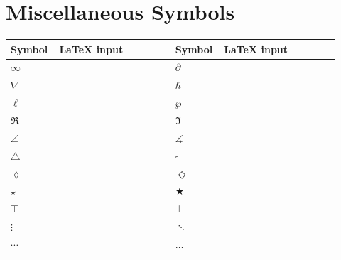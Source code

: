 \documentclass[10pt]{article}
\newcommand{\code}[1]{\texttt{\detokenize{#1}}}
\newcommand{\srow}[4]{$#1$ & \code{#2} & $#3$ & \code{#4}\\}
\newenvironment{symtable}
{\small\begin{longtable}{
  >{\centering\arraybackslash}p{0.12\linewidth}
  >{\raggedright\arraybackslash}p{0.34\linewidth}
  >{\centering\arraybackslash}p{0.12\linewidth}
  >{\raggedright\arraybackslash}p{0.34\linewidth}}
  \toprule
  \textbf{Symbol} & \textbf{LaTeX input} &
  \textbf{Symbol} & \textbf{LaTeX input}\\
  \midrule
  \endhead}
{\bottomrule\end{longtable}}
\begin{document}
\section*{Miscellaneous Symbols}

\begin{symtable}
\srow{\infty}{\infty}{\partial}{\partial}
\srow{\nabla}{\nabla}{\hbar}{\hbar}
\srow{\ell}{\ell}{\wp}{\wp}
\srow{\Re}{\Re}{\Im}{\Im}
\srow{\angle}{\angle}{\measuredangle}{\measuredangle}
\srow{\triangle}{\triangle}{\square}{\square}
\srow{\lozenge}{\lozenge}{\Diamond}{\Diamond}
\srow{\star}{\star}{\bigstar}{\bigstar}
\srow{\top}{\top}{\bot}{\bot}
\srow{\vdots}{\vdots}{\ddots}{\ddots}
\srow{\cdots}{\cdots}{\ldots}{\ldots}
\end{symtable}
\end{document}
